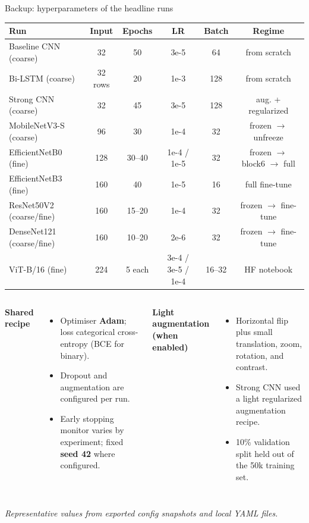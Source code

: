 \documentclass[aspectratio=169,11pt]{beamer}
\newcommand{\source}[1]{{\footnotesize\itshape\textcolor{softgrey}{#1}}}
\begin{document}
\begin{frame}{Backup: hyperparameters of the headline runs}
  \centering
  \footnotesize
  \renewcommand{\arraystretch}{1.08}    %
  \setlength{\tabcolsep}{5pt}
  \begin{tabular}{@{}lccccc@{}}
    \toprule
    \textbf{Run} & \textbf{Input} & \textbf{Epochs} & \textbf{LR} & \textbf{Batch} & \textbf{Regime} \\
    \midrule
    Baseline CNN (coarse)      & 32  & 50 & 3e-5 & 64 & from scratch \\
    Bi-LSTM (coarse)           & 32 rows & 20 & 1e-3 & 128 & from scratch \\
    Strong CNN (coarse)        & 32  & 45 & 3e-5 & 128 & aug. + regularized \\
    MobileNetV3-S (coarse)     & 96  & 30 & 1e-4 & 32 & frozen $\to$ unfreeze \\
    EfficientNetB0 (fine)      & 128 & 30--40 & 1e-4 / 1e-5 & 32 & frozen $\to$ block6 $\to$ full \\
    EfficientNetB3 (fine)      & 160 & 40 & 1e-5 & 16 & full fine-tune \\
    ResNet50V2 (coarse/fine)   & 160 & 15--20 & 1e-4 & 32 & frozen $\to$ fine-tune \\
    DenseNet121 (coarse/fine)  & 160 & 10--20 & 2e-6 & 32 & frozen $\to$ fine-tune \\
    ViT-B/16 (fine)            & 224 & 5 each & 3e-4 / 3e-5 / 1e-4 & 16--32 & HF notebook \\
    \bottomrule
  \end{tabular}

  \vfill
  \begin{columns}[T,onlytextwidth]
      \textbf{Shared recipe}
      \begin{itemize}
        \item Optimiser \textbf{Adam}; loss categorical cross-entropy (BCE for binary).
        \item Dropout and augmentation are configured per run.
        \item Early stopping monitor varies by experiment; fixed \textbf{seed 42} where configured.
      \end{itemize}
      \textbf{Light augmentation (when enabled)}
      \begin{itemize}
        \item Horizontal flip plus small translation, zoom, rotation, and contrast.
        \item Strong CNN used a light regularized augmentation recipe.
        \item 10\% validation split held out of the 50k training set.
      \end{itemize}
  \end{columns}
  \vfill
  \source{Representative values from exported config snapshots and local YAML files.}
\end{frame}
\end{document}
